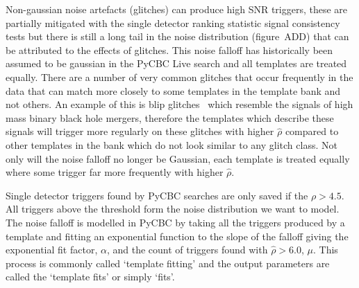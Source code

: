 Non-gaussian noise artefacts (glitches) can produce high SNR triggers, these are partially mitigated with the single detector ranking statistic signal consistency tests but there is still a long tail in the noise distribution (figure~ADD) that can be attributed to the effects of glitches.
%
%
This noise falloff has historically been assumed to be gaussian in the PyCBC Live search and all templates are treated equally. There are a number of very common glitches that occur frequently in the data that can match more closely to some templates in the template bank and not others. An example of this is blip glitches~\cite{blips:2019} which resemble the \gwadj signals of high mass binary black hole mergers, therefore the templates which describe these signals will trigger more regularly on these glitches with higher $\hat{\rho}$ compared to other templates in the bank which do not look similar to any glitch class. Not only will the noise falloff no longer be Gaussian, each template is treated equally where some trigger far more frequently with higher $\hat{\rho}$.

Single detector triggers found by PyCBC searches are only saved if the $\rho > 4.5$. All triggers above the threshold form the noise distribution we want to model. The noise falloff is modelled in PyCBC by taking all the triggers produced by a template and fitting an exponential function to the slope of the falloff giving the exponential fit factor, $\alpha$, and the count of triggers found with $\hat{\rho} > 6.0$, $\mu$. This process is commonly called `template fitting' and the output parameters are called the `template fits' or simply `fits'.

